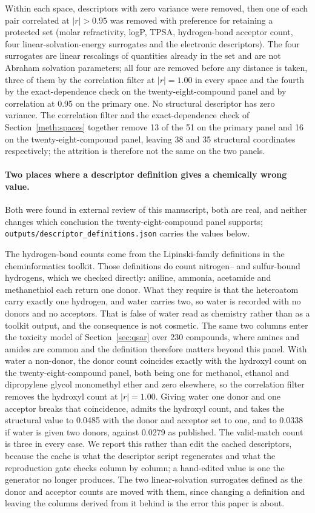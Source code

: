\documentclass[11pt,a4paper]{article}
\begin{document}
Within each space, descriptors with zero variance were removed, then one of each
pair correlated at $|r|>0.95$ was removed with preference for retaining a
protected set (molar refractivity, logP, TPSA, hydrogen-bond acceptor count, four
linear-solvation-energy surrogates and the electronic descriptors). The
four surrogates are linear rescalings of quantities already in the set and are
not Abraham solvation parameters; all four are removed before any
distance is taken, three of them by the correlation filter at $|r| = 1.00$ in
every space and the fourth by the exact-dependence check on the
twenty-eight-compound panel and by correlation at 0.95 on the primary one. No structural descriptor has zero
variance. The correlation filter and the exact-dependence check of
Section~\ref{meth:spaces} together remove 13 of the 51 on the primary panel and
16 on the twenty-eight-compound panel, leaving 38 and 35 structural coordinates
respectively; the attrition is therefore not the same on the two panels.

\paragraph{Two places where a descriptor definition gives a chemically wrong
value.} Both were found in external review of this manuscript, both are real,
and neither changes which conclusion the twenty-eight-compound panel supports;
\texttt{outputs/descriptor\_definitions.json} carries the values below.

The hydrogen-bond counts come from the Lipinski-family definitions in the
cheminformatics toolkit. Those definitions do count nitrogen-- and
sulfur-bound hydrogens, which we checked directly: aniline, ammonia, acetamide
and methanethiol each return one donor. What they require is that the
heteroatom carry exactly one hydrogen, and water carries two, so water is
recorded with no donors and no acceptors. That is false of water read as
chemistry rather than as a toolkit output, and the consequence is not
cosmetic. The same two columns enter the toxicity model of
Section~\ref{sec:qsar} over 230 compounds, where amines and amides are common
and the definition therefore matters beyond this panel. With water a non-donor, the donor count coincides exactly with the
hydroxyl count on the twenty-eight-compound panel, both being one for methanol,
ethanol and dipropylene glycol monomethyl ether and zero elsewhere, so the
correlation filter removes the hydroxyl count at $|r| = 1.00$. Giving water one
donor and one acceptor breaks that coincidence, admits the hydroxyl count, and
takes the structural value to 0.0485 with the donor and acceptor set to one, and
to 0.0338 if water is given two donors, against 0.0279 as published. The
valid-match count is three in every case. We report this rather than edit the
cached descriptors, because the cache is what the descriptor script regenerates
and what the reproduction gate checks column by column; a hand-edited value is
one the generator no longer produces. The two linear-solvation surrogates
defined as the donor and acceptor counts are moved with them, since changing a
definition and leaving the columns derived from it behind is the error this paper
is about.
\end{document}
